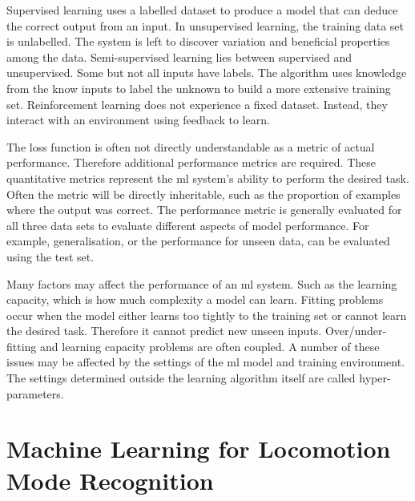Supervised learning uses a labelled dataset to produce a model that can deduce the correct output from an input.\cite{Burkov2019} In unsupervised learning, the training data set is unlabelled. The system is left to discover variation and beneficial properties among the data. Semi-supervised learning lies between supervised and unsupervised. Some but not all inputs have labels. The algorithm uses knowledge from the know inputs to label the unknown to build a more extensive training set.\cite{Abdallah2018} Reinforcement learning does not experience a fixed dataset. Instead, they interact with an environment using feedback to learn.

The loss function is often not directly understandable as a metric of actual performance. Therefore additional performance metrics are required. These quantitative metrics represent the \acrshort{ml} system's ability to perform the desired task. Often the metric will be directly inheritable, such as the proportion of examples where the output was correct. The performance metric is generally evaluated for all three data sets to evaluate different aspects of model performance. For example, generalisation, or the performance for unseen data, can be evaluated using the test set.

Many factors may affect the performance of an \acrshort{ml} system. Such as the learning capacity, which is how much complexity a model can learn. Fitting problems occur when the model either learns too tightly to the training set or cannot learn the desired task. Therefore it cannot predict new unseen inputs. Over/under-fitting and learning capacity problems are often coupled. A number of these issues may be affected by the settings of the \acrshort{ml} model and training environment. The settings determined outside the learning algorithm itself are called hyper-parameters.\cite{Goodfellow2015}


\section{Machine Learning for Locomotion Mode Recognition}

